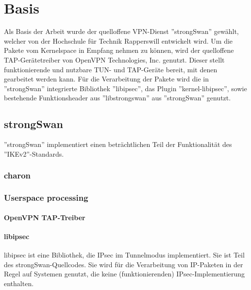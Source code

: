 


\section{Basis}
Als Basis der Arbeit wurde der quelloffene VPN-Dienst ''strongSwan'' gewählt,
welcher von der Hochschule für Technik Rapperswill entwickelt wird.
Um die Pakete vom Kernelspace in Empfang nehmen zu können, wird der quelloffene
TAP-Gerätetreiber von OpenVPN Technologies, Inc. genutzt. Dieser stellt funktionierende
und nutzbare TUN- und TAP-Geräte bereit, mit denen gearbeitet werden kann.
Für die Verarbeitung der Pakete wird die in ''strongSwan'' integrierte Bibliothek ''libipsec'',
das Plugin ''kernel-libipsec'', sowie bestehende Funktionsheader aus ''libstrongswan''
aus ''strongSwan'' genutzt.
\subsection{strongSwan}
''strongSwan'' implementiert einen beträchtlichen Teil der Funktionalität des ''IKEv2''-Standards\cite{charlie_kaufman_rfc_2005}.
\subsubsection{charon}
\subsubsection{Userspace processing}
\paragraph{OpenVPN TAP-Treiber}
\paragraph{libipsec}
libipsec ist eine Bibliothek, die IPsec im Tunnelmodus implementiert.
Sie ist Teil des strongSwan-Quellcodes. Sie wird für die Verarbeitung von IP-Paketen
in der Regel auf Systemen genutzt, die keine (funktionierenden) IPsec-Implementierung
enthalten.

